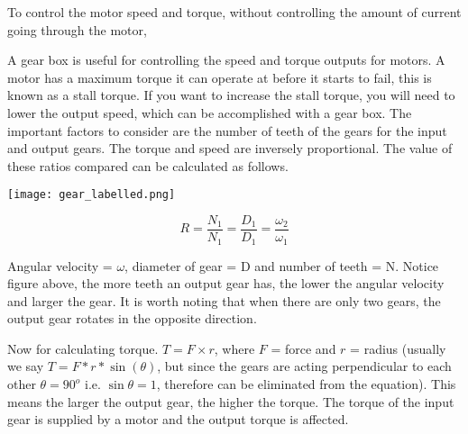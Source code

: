 \documentclass[../TinyBot.tex]{subfiles}
\begin{document}
\begin{minipage}[t]{0.6\textwidth}\vspace{0pt}

    To control the motor speed and torque, without controlling the amount of current going through the motor, 

    A gear box is useful for controlling the speed and torque outputs for motors. A motor has a maximum torque it can operate at before it starts to fail, this is known as a stall torque. If you want to increase the stall torque, you will need to lower the output speed, which can be accomplished with a gear box. The important factors to consider are the number of teeth of the gears for the input and output gears. The torque and speed are inversely proportional. The value of these ratios compared can be calculated as follows.\\
    
\end{minipage}
\begin{minipage}[t]{0.4\textwidth}\vspace{0pt}
    \begin{center}
        \texttt{[image: gear\_labelled.png]}
        \label{fig:gear-driver-driven}
    \end{center}
\end{minipage}


\[ R = \frac{N_1}{N_1} = \frac{D_1}{D_1} = \frac{\omega_2}{\omega_1} \]

Angular velocity = $\omega$, diameter of gear = D and number of teeth = N. Notice figure above, the more teeth an output gear has, the lower the angular velocity and larger the gear. It is worth noting that when there are only two gears, the output gear rotates in the opposite direction.


Now for calculating torque. \(T=F \times r\), where $F$ = force and $r$ = radius (usually we say $T = F*r*\sin(\theta)$, but since the gears are acting perpendicular to each other $\theta = 90^o$ i.e. $\sin{\theta} = 1$, therefore can be eliminated from the equation). This means the larger the output gear, the higher the torque. The torque of the input gear is supplied by a motor and the output torque is affected. \\
\end{document}
